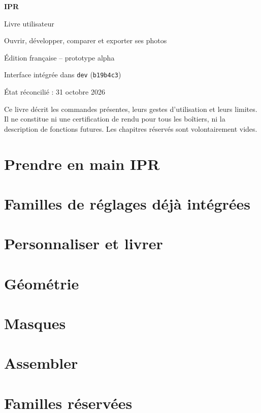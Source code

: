 \documentclass[12pt,a4paper,oneside]{report}
\begin{document}
\begin{titlepage}
\centering
\vspace*{2cm}
{\Huge\bfseries IPR\par}
\vspace{0.5cm}
{\LARGE Livre utilisateur\par}
\vspace{1cm}
{\large Ouvrir, développer, comparer et exporter ses photos\par}
\vfill
Édition française -- prototype alpha\par
Interface intégrée dans \texttt{dev} (\texttt{b19b4c3})\par
État réconcilié : 31 octobre 2026\par
\vfill
\begin{minipage}{0.88\textwidth}
Ce livre décrit les commandes présentes, leurs gestes d’utilisation et leurs
limites. Il ne constitue ni une certification de rendu pour tous les boîtiers,
ni la description de fonctions futures. Les chapitres réservés sont volontairement vides.
\end{minipage}
\end{titlepage}
\hypersetup{pageanchor=true}
\tableofcontents
\clearpage
{}
\part{Prendre en main IPR}



\part{Familles de réglages déjà intégrées}










\part{Personnaliser et livrer}



\part{Géométrie}

\part{Masques}

\part{Assembler}

\part{Familles réservées}

\appendix


\end{document}
